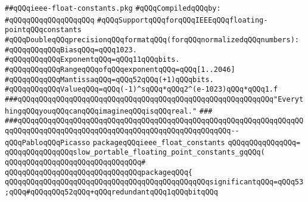 \label{src/lib/compiler/src/fconst/ieee-float-constants.pkg}
\verb|##qQQqieee-float-constants.pkg|\newline
\newline
\verb|#qQQqCompiledqQQqby:|\newline
\verb|#qQQqqQQqqQQqqQQqqQQq|\newline
\newline
\newline
\newline
\verb|#qQQqSupportqQQqforqQQqIEEEqQQqfloating-pointqQQqconstants|\newline
\verb|#qQQqDoubleqQQqprecisionqQQqformatqQQq(forqQQqnormalizedqQQqnumbers):|\newline
\verb|#qQQqqQQqqQQqBiasqQQq=qQQq1023.|\newline
\verb|#qQQqqQQqqQQqExponentqQQq=qQQq11qQQqbits.|\newline
\verb|#qQQqqQQqqQQqRangeqQQqofqQQqexponentqQQq=qQQq[1..2046]|\newline
\verb|#qQQqqQQqqQQqMantissaqQQq=qQQq52qQQq(+1)qQQqbits.|\newline
\verb|#qQQqqQQqqQQqValueqQQq=qQQq(-1)^sqQQq*qQQq2^(e-1023)qQQq*qQQq1.f|\newline
\newline
\newline
\newline
\verb|###qQQqqQQqqQQqqQQqqQQqqQQqqQQqqQQqqQQqqQQqqQQqqQQqqQQqqQQqqQQq"EverythingqQQqyouqQQqcanqQQqimagineqQQqisqQQqreal."|\newline
\verb|###|\newline
\verb|###qQQqqQQqqQQqqQQqqQQqqQQqqQQqqQQqqQQqqQQqqQQqqQQqqQQqqQQqqQQqqQQqqQQqqQQqqQQqqQQqqQQqqQQqqQQqqQQqqQQqqQQqqQQqqQQqqQQqqQQq--qQQqPabloqQQqPicasso|\newline
\newline
\newline
\newline
\verb|packageqQQqieee_float_constants|\newline
\verb|qQQqqQQqqQQqqQQq=|\newline
\verb|qQQqqQQqqQQqqQQqslow_portable_floating_point_constants_gqQQq(|\newline
\verb|qQQqqQQqqQQqqQQqqQQqqQQqqQQqqQQq#|\newline
\verb|qQQqqQQqqQQqqQQqqQQqqQQqqQQqqQQqpackageqQQq{|\newline
\verb|qQQqqQQqqQQqqQQqqQQqqQQqqQQqqQQqqQQqqQQqqQQqqQQqsignificantqQQq=qQQq53;qQQq#qQQqqQQq52qQQq+qQQqredundantqQQq1qQQqbitqQQq|\newline
